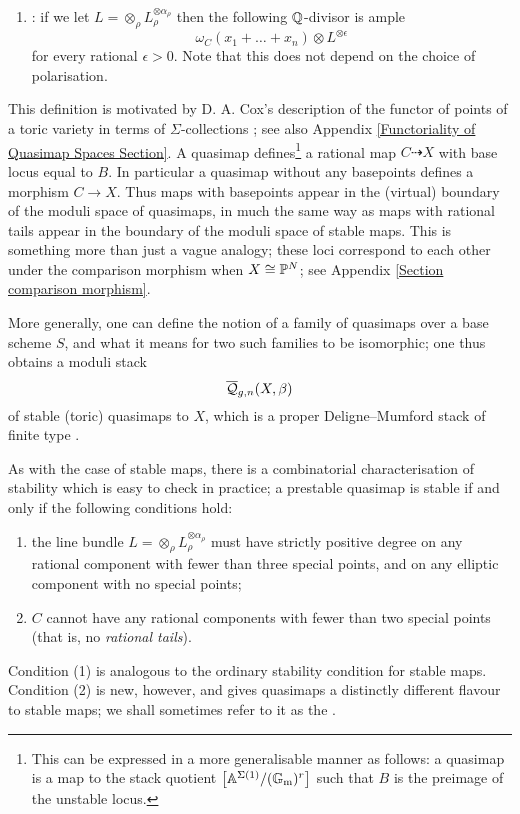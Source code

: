 \begin{definition}[{\cite[Definition 3.1.1]{CF-K}}]
\begin{enumerate}
\item {}: if we let $L = \otimes_\rho L_\rho^{\otimes \alpha_\rho}$ then the following $\mathbb{Q}$-divisor is ample
\begin{equation*} \omega_C(x_1 + \ldots + x_n)\otimes L^{\otimes \epsilon} \end{equation*}
for every rational $\epsilon > 0$.  Note that this does not depend on the choice of polarisation.
\end{enumerate}
\end{definition}


\begin{remark} This definition is motivated by D. A. Cox's description of the functor of points of a toric variety in terms of $\Sigma$-collections \cite{CoxFunctor}; see also Appendix \ref{Functoriality of Quasimap Spaces Section}. A quasimap defines\footnote{This can be expressed in a more generalisable manner as follows: a quasimap is a map to the stack quotient $\big[\mathbb{A}^{\Sigma(1)} / (\mathbb{G}_{\text{m}})^r\big]$ such that $B$ is the preimage of the unstable locus.} a rational map $C \dashrightarrow X$ with base locus equal to $B$.
In particular a quasimap without any basepoints defines a morphism $C \to X$. Thus maps with basepoints appear in the (virtual) boundary of the moduli space of quasimaps, in much the same way as maps with rational tails appear in the boundary of the moduli space of stable maps. This is something more than just a vague analogy; these loci correspond to each other under the comparison morphism when $X\cong\mathbb P^N$; see Appendix \ref{Section comparison morphism}. \end{remark}

More generally, one can define the notion of a family of quasimaps over a base scheme $S$, and what it means for two such families to be isomorphic; one thus obtains a moduli stack
\begin{equation*} \overline{\mathcal Q}_{g,n}(X,\beta) \end{equation*}
of stable (toric) quasimaps to $X$, which is a proper Deligne--Mumford stack of finite type \cite[\S 3]{CF-K}.

\medskip

As with the case of stable maps, there is a combinatorial characterisation of stability which is easy to check in practice; a prestable quasimap is stable if and only if the following conditions hold:
\begin{enumerate}
\item the line bundle $L = \otimes_\rho L_\rho^{\otimes \alpha_\rho}$ must have strictly positive degree on any rational component with fewer than three special points, and on any elliptic component with no special points;
\item $C$ cannot have any rational components with fewer than two special points (that is, no \emph{rational tails}).
\end{enumerate}
Condition (1) is analogous to the ordinary stability condition for stable maps. Condition (2) is new, however, and gives quasimaps a distinctly different flavour to stable maps; we shall sometimes refer to it as the . 

